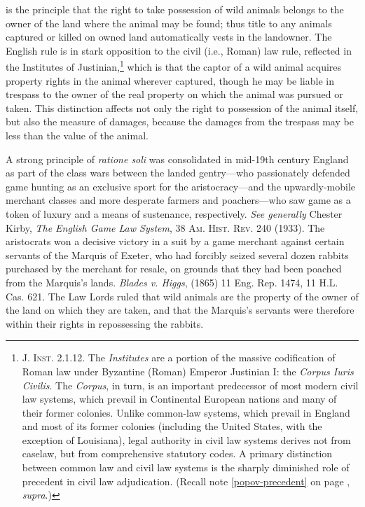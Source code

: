 
 is the principle that the right to take
possession of wild animals belongs to the owner of the land where the animal may
be found; thus title to any animals captured or killed on owned land
automatically vests in the landowner. The English rule is in stark opposition to
the civil (i.e., Roman) law rule, reflected in the Institutes of
Justinian,\footnote{\textsc{J. Inst.} 2.1.12. The \textit{Institutes} are a
portion of the massive codification of Roman law under Byzantine (Roman) Emperor
Justinian I: the \textit{Corpus Iuris Civilis}. The \textit{Corpus}, in turn, is
an important predecessor of most modern civil law systems, which prevail in
Continental European nations and many of their former colonies. Unlike
common-law systems, which prevail in England and most of its former colonies
(including the United States, with the exception of Louisiana), legal authority
in civil law systems derives not from caselaw, but from comprehensive statutory
codes. A primary distinction between common law and civil law systems is the
sharply diminished role of precedent in civil law adjudication. (Recall note
\ref{popov-precedent} on page \pageref{popov-precedent}, \textit{supra}.)}
which is that the captor of a wild animal acquires property rights in the animal
wherever captured, though he may be liable in trespass to the owner of the real
property on which the animal was pursued or taken. This distinction affects not
only the right to possession of the animal itself, but also the measure of
damages, because the damages from the trespass may be less than the value of the
animal.

A strong principle of \textit{ratione soli} was consolidated in mid-19th century
England as part of the class wars between the landed gentry---who passionately
defended game hunting as an exclusive sport for the aristocracy---and the
upwardly-mobile merchant classes and more desperate farmers and poachers---who
saw game as a token of luxury and a means of sustenance, respectively.
\textit{See generally} Chester Kirby, \emph{The English Game Law System}, 38
\textsc{Am. Hist. Rev.} 240 (1933). The aristocrats won a decisive victory in a
suit by a game merchant against certain servants of the Marquis of Exeter, who
had forcibly seized several dozen rabbits purchased by the merchant for resale,
on grounds that they had been poached from the Marquis's lands. \emph{Blades v.
Higgs}, (1865) 11 Eng. Rep. 1474, 11 H.L. Cas. 621. The Law Lords ruled that
wild animals
are the property of the owner of the land on which they are taken, and that the
Marquis's servants were therefore within their rights in repossessing the
rabbits.

